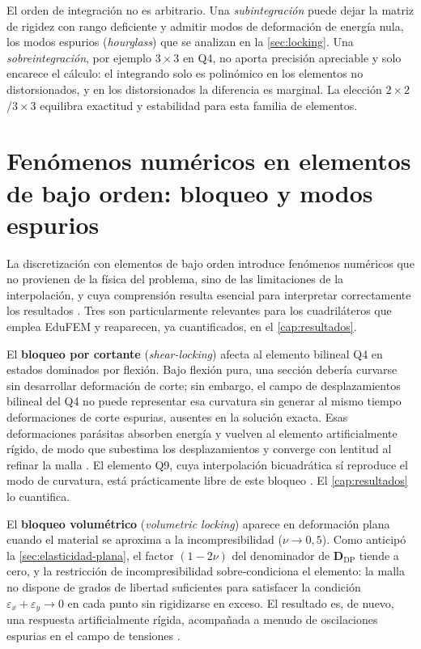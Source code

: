 El orden de integración no es arbitrario. Una \emph{subintegración} puede dejar la matriz de rigidez con rango deficiente y admitir modos de deformación de energía nula, los modos espurios (\emph{hourglass}) que se analizan en la \autoref{sec:locking}. Una \emph{sobreintegración}, por ejemplo $3\times3$ en Q4, no aporta precisión apreciable y solo encarece el cálculo: el integrando solo es polinómico en los elementos no distorsionados, y en los distorsionados la diferencia es marginal. La elección $2\times2$/$3\times3$ equilibra exactitud y estabilidad para esta familia de elementos.

\section{Fenómenos numéricos en elementos de bajo orden: bloqueo y modos espurios}
\label{sec:locking}

La discretización con elementos de bajo orden introduce fenómenos numéricos que no provienen de la física del problema, sino de las limitaciones de la interpolación, y cuya comprensión resulta esencial para interpretar correctamente los resultados \autocite{cook2002concepts,hughes2000fem,bathe2014fem}. Tres son particularmente relevantes para los cuadriláteros que emplea EduFEM y reaparecen, ya cuantificados, en el \autoref{cap:resultados}.

El \textbf{bloqueo por cortante} (\emph{shear-locking}) afecta al elemento bilineal Q4 en estados dominados por flexión. Bajo flexión pura, una sección debería curvarse sin desarrollar deformación de corte; sin embargo, el campo de desplazamientos bilineal del Q4 no puede representar esa curvatura sin generar al mismo tiempo deformaciones de corte espurias, ausentes en la solución exacta. Esas deformaciones parásitas absorben energía y vuelven al elemento artificialmente rígido, de modo que subestima los desplazamientos y converge con lentitud al refinar la malla \autocites[pp.~98-99]{cook2002concepts}[p.~243]{hughes2000fem}. El elemento Q9, cuya interpolación bicuadrática sí reproduce el modo de curvatura, está prácticamente libre de este bloqueo \autocites[pp.~235-236]{cook2002concepts}[p.~243]{hughes2000fem}. El \autoref{cap:resultados} lo cuantifica.

El \textbf{bloqueo volumétrico} (\emph{volumetric locking}) aparece en deformación plana cuando el material se aproxima a la incompresibilidad ($\nu \to 0{,}5$). Como anticipó la \autoref{sec:elasticidad-plana}, el factor $(1-2\nu)$ del denominador de $\bm{D}_{\text{DP}}$ tiende a cero, y la restricción de incompresibilidad sobre-condiciona el elemento: la malla no dispone de grados de libertad suficientes para satisfacer la condición $\varepsilon_x + \varepsilon_y \to 0$ en cada punto sin rigidizarse en exceso. El resultado es, de nuevo, una respuesta artificialmente rígida, acompañada a menudo de oscilaciones espurias en el campo de tensiones \autocites[pp.~192, 208]{hughes2000fem}[pp.~282-283]{bathe2014fem}.

